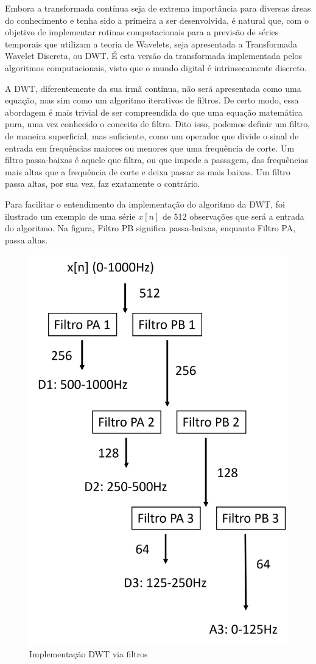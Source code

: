 \documentclass[12pt]{article}
\begin{document}
	Embora a transformada contínua seja de extrema importância para diversas áreas do conhecimento e tenha sido a primeira a ser desenvolvida, é natural que, com o objetivo de implementar rotinas computacionais para a previsão de séries temporais que utilizam a teoria de \textrm{Wavelets}, seja apresentada a \textrm{Transformada Wavelet Discreta}, ou \textrm{DWT}. É esta versão da transformada implementada pelos algoritmos computacionais, visto que o mundo digital é intrinsecamente discreto.
	
	A \textrm{DWT}, diferentemente da sua irmã contínua, não será apresentada como uma equação, mas sim como um algoritmo iterativos de filtros. De certo modo, essa abordagem é mais trivial de ser compreendida do que uma equação matemática pura, uma vez conhecido o conceito de filtro. Dito isso, podemos definir um filtro, de maneira superficial, mas suficiente, como um operador que divide o sinal de entrada em frequências maiores ou menores que uma frequência de corte. Um filtro \textrm{passa-baixas} é aquele que filtra, ou que impede a passagem, das frequências mais altas que a frequência de corte e deixa passar as mais baixas. Um filtro \textrm{passa altas}, por sua vez, faz exatamente o contrário.
	
	Para facilitar o entendimento da implementação do algoritmo da \textrm{DWT}, foi ilustrado um exemplo de uma série $x[n]$ de 512 observações que será a entrada do algoritmo. Na figura, Filtro PB significa passa-baixas, enquanto Filtro PA, passa altas.
	\begin{figure}[H]
		\centering
		\includegraphics[width=0.6\linewidth]{Imagens/DWT}
		\caption{Implementação DWT via filtros}
		\label{fig:dwt}
	\end{figure}
	
\end{document}

